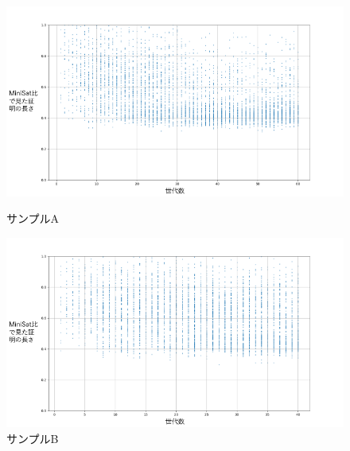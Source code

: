 \begin{figure}[h]
    \centering
    \begin{minipage}{0.43\columnwidth}
        \centering
        \includegraphics[width=\columnwidth]{figures/Experiment1/4-1.png}
        \caption{サンプルA}
        \label{fig:サンプルA}
    \end{minipage}
    \hspace{5mm}
    \begin{minipage}{0.43\columnwidth}
        \centering
        \includegraphics[width=\columnwidth]{figures/Experiment1/4-2.png}
        \caption{サンプルB}
        \label{fig:サンプルB}
    \end{minipage}
  
    \vspace{3mm}
    

\end{figure}
